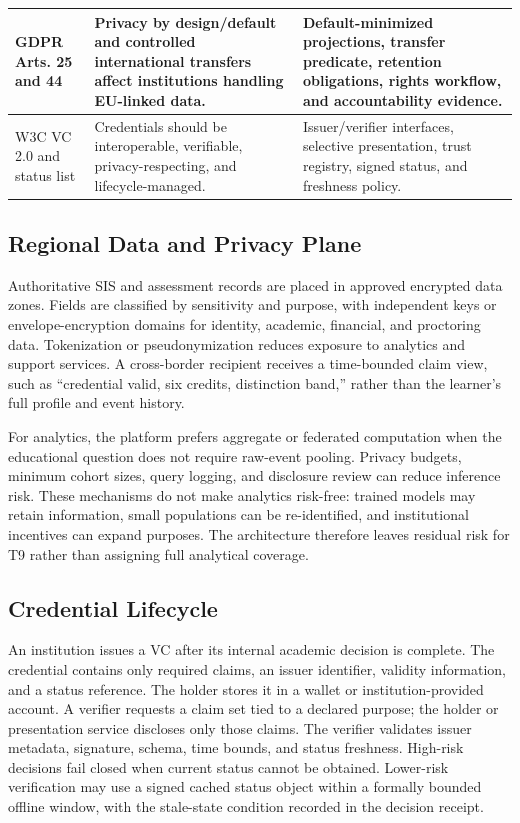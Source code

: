 \documentclass[journal]{IEEEtran}
\begin{document}
\begin{table}[t]
\begin{tabularx}{\textwidth}{|p{}|p{}|Y|}
\hline
GDPR Arts. 25 and 44 \cite{gdpr} & Privacy by design/default and controlled international transfers affect institutions handling EU-linked data. & Default-minimized projections, transfer predicate, retention obligations, rights workflow, and accountability evidence. \\
\hline
W3C VC 2.0 and status list \cite{w3cvc20,w3cstatus} & Credentials should be interoperable, verifiable, privacy-respecting, and lifecycle-managed. & Issuer/verifier interfaces, selective presentation, trust registry, signed status, and freshness policy. \\
\hline
\end{tabularx}
\end{table}

\subsection{Regional Data and Privacy Plane}
Authoritative SIS and assessment records are placed in approved encrypted data zones. Fields are classified by sensitivity and purpose, with independent keys or envelope-encryption domains for identity, academic, financial, and proctoring data. Tokenization or pseudonymization reduces exposure to analytics and support services. A cross-border recipient receives a time-bounded claim view, such as ``credential valid, six credits, distinction band,'' rather than the learner's full profile and event history.

For analytics, the platform prefers aggregate or federated computation when the educational question does not require raw-event pooling. Privacy budgets, minimum cohort sizes, query logging, and disclosure review can reduce inference risk. These mechanisms do not make analytics risk-free: trained models may retain information, small populations can be re-identified, and institutional incentives can expand purposes. The architecture therefore leaves residual risk for T9 rather than assigning full analytical coverage.

\subsection{Credential Lifecycle}
An institution issues a VC after its internal academic decision is complete. The credential contains only required claims, an issuer identifier, validity information, and a status reference. The holder stores it in a wallet or institution-provided account. A verifier requests a claim set tied to a declared purpose; the holder or presentation service discloses only those claims. The verifier validates issuer metadata, signature, schema, time bounds, and status freshness. High-risk decisions fail closed when current status cannot be obtained. Lower-risk verification may use a signed cached status object within a formally bounded offline window, with the stale-state condition recorded in the decision receipt.
\end{document}

